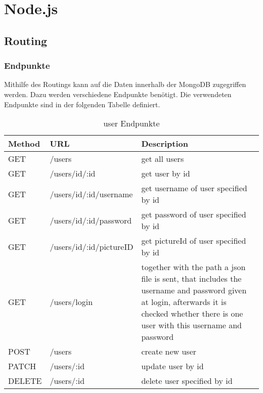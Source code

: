 \chapter{Node.js}

\section{Routing}

\subsection{Endpunkte}

Mithilfe des Routings kann auf die Daten innerhalb der MongoDB zugegriffen werden. Dazu werden verschiedene Endpunkte benötigt. Die verwendeten Endpunkte sind in der folgenden Tabelle definiert.

\begin{table}[!htb]
\begin{tabularx}{\textwidth}{|X|X|X|}
    \hline
    \textbf{Method} & \textbf{URL} & \textbf{Description} \\
    \hline
    \hline
    GET & /users & get all users\\
    \hline
    GET & /users/id/:id & get user by id\\
    \hline
    GET & /users/id/:id/username & get username of user specified by id\\
    \hline 
    GET & /users/id/:id/password & get password of user specified by id\\
    \hline
    GET & /users/id/:id/pictureID & get pictureId of user specified by id\\
    \hline
    GET & /users/login & together with the path a json file is sent, that includes the username and password given at login, afterwards it is checked whether there is one user with this username and password\\
    \hline
    POST & /users & create new user\\
    \hline
    PATCH & /users/:id & update user by id\\
    \hline
    DELETE & /users/:id & delete user specified by id\\
    \hline
\end{tabularx}
\caption{user Endpunkte}
\label{endpunkte}
\end{table}

